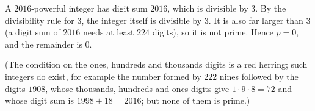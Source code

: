 A $2016$-powerful integer has digit sum $2016$, which is divisible by $3$. By the divisibility rule for $3$, the integer itself is divisible by $3$. It is also far larger than $3$ (a digit sum of $2016$ needs at least $224$ digits), so it is not prime. Hence $p=0$, and the remainder is $\boxed{0}$.

(The condition on the ones, hundreds and thousands digits is a red herring; such integers do exist, for example the number formed by $222$ nines followed by the digits $1908$, whose thousands, hundreds and ones digits give $1\cdot9\cdot8=72$ and whose digit sum is $1998+18=2016$; but none of them is prime.)
